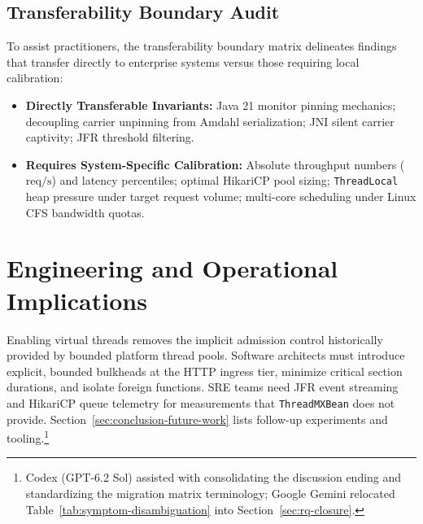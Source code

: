 \subsection{Transferability Boundary Audit}
To assist practitioners, the transferability boundary matrix delineates findings that transfer directly to enterprise systems versus those requiring local calibration:
\begin{itemize}
  \item \textbf{Directly Transferable Invariants:} Java 21 monitor pinning mechanics; decoupling carrier unpinning from Amdahl serialization; JNI silent carrier captivity; JFR threshold filtering.
  \item \textbf{Requires System-Specific Calibration:} Absolute throughput numbers ($\text{req/s}$) and latency percentiles; optimal HikariCP pool sizing; \texttt{ThreadLocal} heap pressure under target request volume; multi-core scheduling under Linux CFS bandwidth quotas.
\end{itemize}

\section{Engineering and Operational Implications}
\label{sec:engineering-relevance}

Enabling virtual threads removes the implicit admission control historically provided by bounded platform thread pools. Software architects must introduce explicit, bounded bulkheads at the HTTP ingress tier, minimize critical section durations, and isolate foreign functions. SRE teams need JFR event streaming and HikariCP queue telemetry for measurements that \texttt{ThreadMXBean} does not provide. Section~\ref{sec:conclusion-future-work} lists follow-up experiments and tooling.\footnote{Codex (GPT-6.2 Sol) assisted with consolidating the discussion ending and standardizing the migration matrix terminology; Google Gemini relocated Table~\ref{tab:symptom-disambiguation} into Section~\ref{sec:rq-closure}.}
